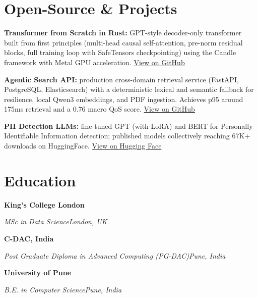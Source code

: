 \documentclass[10pt,a4paper]{article}
\newcommand{\entry}[4]{%
  {\color{company}\bfseries #1}\hfill {\color{muted}#2}\par
  \vspace{1pt}
  {\itshape #3}\hfill {\color{muted}\itshape #4}\par
  \vspace{3pt}%
}
\begin{document}
\section{Open-Source \& Projects}
\begin{tight}
  \item \textbf{Transformer from Scratch in Rust:} GPT-style decoder-only transformer built from first principles (multi-head causal self-attention, pre-norm residual blocks, full training loop with SafeTensors checkpointing) using the Candle framework with Metal GPU acceleration. \href{https://github.com/abhijeetscode/transformer-rust}{View on GitHub}
  \item \textbf{Agentic Search API:} production cross-domain retrieval service (FastAPI, PostgreSQL, Elasticsearch) with a deterministic lexical and semantic fallback for resilience, local Qwen3 embeddings, and PDF ingestion. Achieves p95 around 175ms retrieval and a 0.76 macro QoS score. \href{https://github.com/abhijeetscode/search-agent}{View on GitHub}
  \item \textbf{PII Detection LLMs:} fine-tuned GPT (with LoRA) and BERT for Personally Identifiable Information detection; published models collectively reaching 67K+ downloads on HuggingFace. \href{https://huggingface.co/ab-ai/pii_model}{View on Hugging Face}
\end{tight}

\section{Education}
\entry{King's College London}{}{MSc in Data Science}{London, UK}
\vspace{-3pt}
\entry{C-DAC, India}{}{Post Graduate Diploma in Advanced Computing (PG-DAC)}{Pune, India}
\vspace{-3pt}
\entry{University of Pune}{}{B.E. in Computer Science}{Pune, India}
\end{document}
